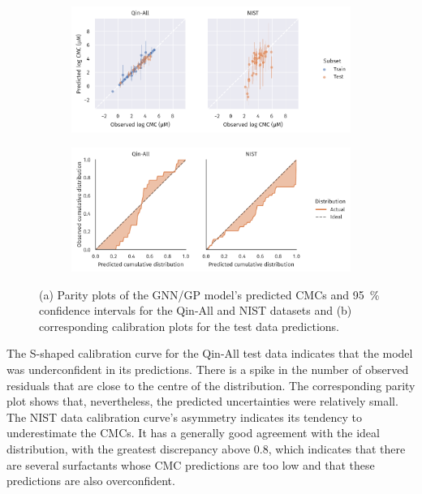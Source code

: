 \begin{figure}
    \centering
    \begin{subfigure}{\textwidth}
        \includegraphics[width=\textwidth]{images/uq-parity.pdf}
        \caption{}
        \label{fig:uq-parity}
    \end{subfigure}
    \begin{subfigure}{\textwidth}
        \includegraphics[width=\textwidth]{images/uq-calibration.pdf}
        \caption{}
        \label{fig:uq-calibration}
    \end{subfigure}
    \caption{(a) Parity plots of the GNN/GP model's predicted CMCs and \SI{95}{\%}
        confidence intervals for the Qin-All and NIST datasets and (b) corresponding
        calibration plots for the test data predictions.}
\end{figure}

The S-shaped calibration curve for the Qin-All test data indicates that the
model was underconfident in its predictions. There is a spike in the number of
observed residuals that are close to the centre of the distribution. The
corresponding parity plot shows that, nevertheless, the predicted uncertainties
were relatively small. The NIST data calibration curve's asymmetry indicates its
tendency to underestimate the CMCs. It has a generally good agreement with the
ideal distribution, with the greatest discrepancy above \num{0.8}, which
indicates that there are several surfactants whose CMC predictions are too low
and that these predictions are also overconfident.

